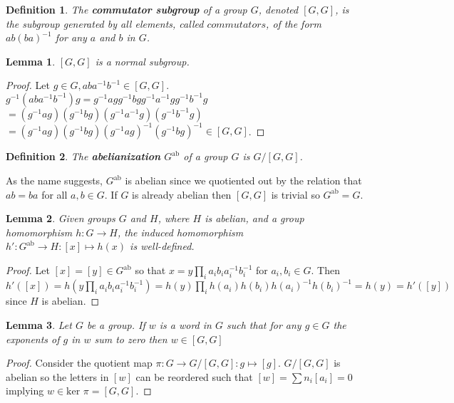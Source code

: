\documentclass{report}
\newtheorem{definition}{Definition}
\newtheorem{lemma}{Lemma}
\begin{document}
\begin{definition}
The \textbf{commutator subgroup} of a group $G$, denoted $[G,G]$, is the subgroup generated by all elements, called $commutators$, of the form $ab(ba)^{-1}$ for any $a$ and $b$ in $G$.
\end{definition}

\begin{lemma}
$[G,G]$ is a normal subgroup.
\end{lemma}
\begin{proof}
Let $g\in G,aba^{-1}b^{-1}\in [G,G]$.\\
$g^{-1}(aba^{-1}b^{-1})g=g^{-1}agg^{-1}bgg^{-1}a^{-1}gg^{-1}b^{-1}g$\\
$=(g^{-1}ag)(g^{-1}bg)(g^{-1}a^{-1}g)(g^{-1}b^{-1}g)$\\
$=(g^{-1}ag)(g^{-1}bg)(g^{-1}ag)^{-1}(g^{-1}bg)^{-1}\in[G,G]$.
\end{proof}
\begin{definition}
The \textbf{abelianization} $G^{\text{ab}}$ of a group $G$ is $G/[G,G]$.
\end{definition}
\noindent As the name suggests, $G^{\text{ab}}$ is abelian since we quotiented out by the relation that $ab=ba$ for all $a,b\in G$. If $G$ is already abelian then $[G,G]$ is trivial so $G^{\text{ab}}=G$.

\begin{lemma}
Given groups $G$ and $H$, where $H$ is abelian, and a group homomorphism $h\colon G\to H$, the induced homomorphism $h'\colon G^{\text{ab}}\to H:[x]\mapsto h(x)$ is well-defined.
\end{lemma}
\begin{proof}
Let $[x]=[y]\in G^{\text{ab}}$ so that $x=y\prod_ia_ib_ia_i^{-1}b_i^{-1}$ for $a_i,b_i\in G$.
Then $h'([x])=h(y\prod_ia_ib_ia_i^{-1}b_i^{-1})=h(y)\prod_ih(a_i)h(b_i)h(a_i)^{-1}h(b_i)^{-1}=h(y)=h'([y])$ since $H$ is abelian.
\end{proof}

\begin{lemma}
Let $G$ be a group. If $w$ is a word in $G$ such that for any $g\in G$ the exponents of $g$ in $w$ sum to zero then $w\in[G,G]$ 
\end{lemma}
\begin{proof}
Consider the quotient map $\pi\colon G\to G/[G,G]:g\mapsto[g]$.
$G/[G,G]$ is abelian so the letters in $[w]$ can be reordered such that $[w]=\sum n_i[a_i]=0$ implying $w\in\text{ker }\pi=[G,G]$. 
\end{proof}
\end{document}
